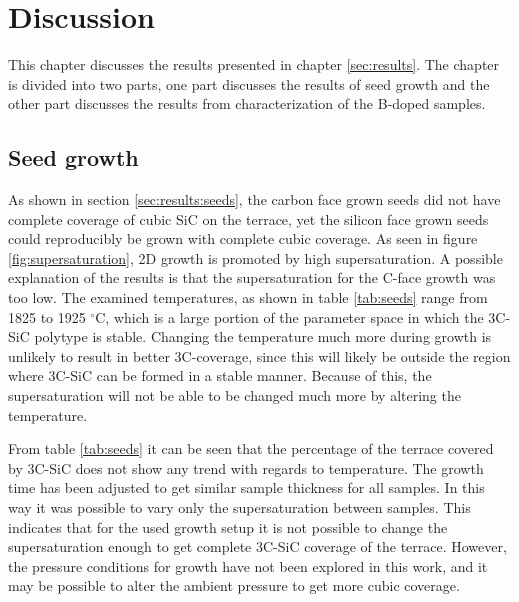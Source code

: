 
\chapter{Discussion}
\label{sec:discussion}
This chapter discusses the results presented in chapter \ref{sec:results}. The chapter is divided into two parts, one part discusses the results of seed growth and the other part discusses the results from characterization of the B-doped samples. 

\section{Seed growth}
As shown in section \ref{sec:results:seeds}, the carbon face grown seeds did not have complete coverage of cubic SiC on the terrace, yet the silicon face grown seeds could reproducibly be grown with complete cubic coverage. As seen in figure \ref{fig:supersaturation}, 2D growth is promoted by high supersaturation. A possible explanation of the results is that the supersaturation for the C-face growth was too low. The examined temperatures, as shown in table \ref{tab:seeds}  range from 1825 to 1925 $^\circ$C, which is a large portion of the parameter space in which the 3C-SiC polytype is stable. Changing the temperature much more during growth is unlikely to result in better 3C-coverage, since this will likely be outside the region where 3C-SiC can be formed in a stable manner. Because of this, the supersaturation will not be able to be changed much more by altering the temperature. 

From table \ref{tab:seeds} it can be seen that the percentage of the terrace covered by 3C-SiC does not show any trend with regards to temperature. The growth time has been adjusted to get similar sample thickness for all samples. In this way it was possible to vary only the supersaturation between samples. This indicates that for the used growth setup it is not possible to change the supersaturation enough to get complete 3C-SiC coverage of the terrace. However, the pressure conditions for growth have not been explored in this work, and it may be possible to alter the ambient pressure to get more cubic coverage. 

